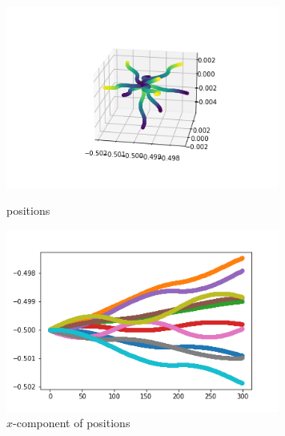 \documentclass[12pt]{article}
\begin{document}
	\begin{figure}[H]
		\begin{multicols}{2}
			\includegraphics[width=\linewidth, height=6cm]{multips2Bz.png} \caption{positions} \label{multips2Bz} \par
			\includegraphics[width=\linewidth, height=6cm]{multipsx2Bz.png} \caption{$x$-component of positions} \label{multipsx2Bz} \par
		\end{multicols}
	\end{figure}
\end{document}
